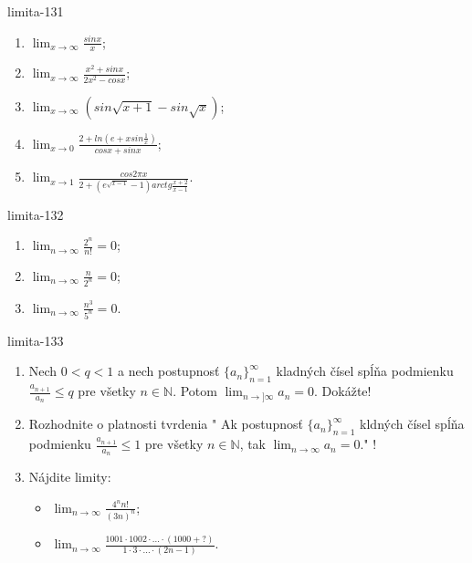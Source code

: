 \begin{defproblem}{limita-131}
\begin{multicols}{2}
\begin{enumerate}
    \item $\lim_{{x \rightarrow \infty}} \frac{sin x}{x}$;
    \item $\lim_{{x \rightarrow \infty}} \frac{x^2+sin x}{2x^2-cos x}$;
    \item $\lim_{{x \rightarrow \infty}} (sin \sqrt{x+1}-sin \sqrt{x})$;
    \item $\lim_{{x \rightarrow 0}} \frac{2+ln (e+x sin \frac{1}{x})}{cos x + sin x}$;
    \item $\lim_{{x \rightarrow 1}} \frac{cos 2\pi x}{2+(e^{\sqrt{x-1}}-1)arctg \frac{x+2}{x-1}}$.
\end{enumerate}
\end{multicols}
\end{defproblem}

\begin{defproblem}{limita-132}
\begin{enumerate}
\item $\lim_{n \rightarrow \infty} \frac{2^n}{n!}=0$;
\item $\lim_{n \rightarrow \infty} \frac{n}{2^n}=0$;
\item $\lim_{n \rightarrow \infty} \frac{n^3}{5^n}=0$.
\end{enumerate}
\end{defproblem}

\begin{defproblem}{limita-133}
\begin{enumerate}
\item Nech $0<q<1$ a nech postupnosť ${\{a_n\}}_{n=1}^\infty$ kladných čísel spĺňa podmienku $\frac{a_{n+1}}{a_{n}} \leq q$ pre všetky $n \in \mathbb{N}$. Potom $\lim_{n \rightarrow] \infty} a_n=0$. Dokážte!
\item Rozhodnite o platnosti tvrdenia " Ak postupnosť ${\{a_n\}}_{n=1}^\infty$ kldných čísel spĺňa podmienku $\frac{a_{n+1}}{a_{n}} \leq 1$ pre všetky $n \in \mathbb{N}$, tak $\lim_{n \rightarrow \infty} a_n=0$." !
\item Nájdite limity:
\begin{itemize}
\item $\lim_{n \rightarrow \infty} \frac{4^n n!}{(3n)^n}$;
\item $\lim_{n \rightarrow \infty} \frac{1001 \cdot 1002 \cdot ... \cdot (1000+?)}{1 \cdot 3 \cdot ... \cdot (2n-1)}$.
\end{itemize}
\end{enumerate}
\end{defproblem}

